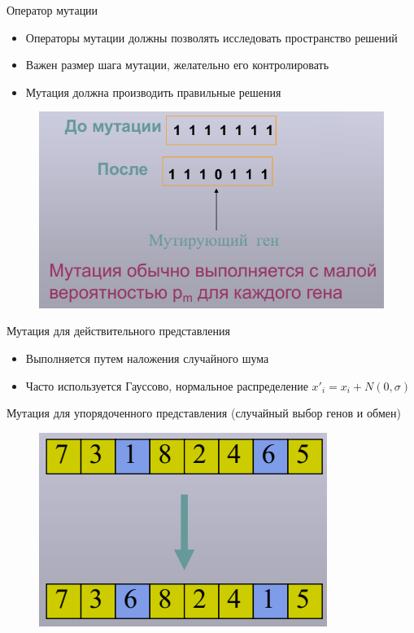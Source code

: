 \documentclass{beamer}
\begin{document}
\begin{frame}{Оператор мутации}
\begin{itemize}
\item Операторы мутации должны позволять исследовать пространство решений
\item Важен размер шага мутации, желательно его контролировать
\item Мутация должна производить правильные решения
\end{itemize}
\begin{figure}[h]
\centering
\includegraphics[scale=0.4]{images/lec04-pic30.png}
\end{figure}
\end{frame}

\begin{frame}
Мутация для действительного представления
\begin{itemize}
\item Выполняется путем наложения случайного шума
\item Часто используется Гауссово, нормальное распределение $x'_i=x_i+N(0, \sigma)$
\end{itemize}
Мутация для упорядоченного представления (случайный выбор генов и обмен)
\begin{figure}[h]
\centering
\includegraphics[scale=0.4]{images/lec04-pic31.png}
\end{figure}
\end{frame}
\end{document}
